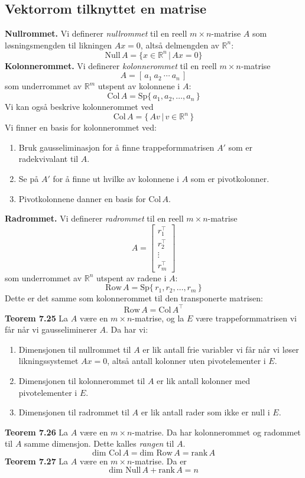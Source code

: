 \documentclass{article}
\begin{document}
\subsection{Vektorrom tilknyttet en matrise}
\textbf{Nullrommet.} Vi definerer \textit{nullrommet} til en reell $m \times n$-matrise $A$ som løsningsmengden til likningen $Ax = 0$, altså delmengden av $\mathbb{R}^n$:
\[ \text{Null}\,A = \{ x \in \mathbb{R}^n \,|\, Ax = 0 \} \]
\textbf{Kolonnerommet.} Vi definerer \textit{kolonnerommet} til en reell $m \times n$-matrise
\[ A = [\, a_1 \ a_2 \ \cdots \ a_n \,] \]
som underrommet av $\mathbb{R}^m$ utspent av kolonnene i $A$:
\[ \text{Col}\,A = \text{Sp} \{\, a_1, a_2, \dots, a_n \,\} \]
Vi kan også beskrive kolonnerommet ved
\[ \text{Col}\,A = \{\, Av \,|\, v \in \mathbb{R}^n \,\} \]
Vi finner en basis for kolonnerommet ved:
\begin{enumerate}
    \item Bruk gausseliminasjon for å finne trappeformmatrisen $A'$ som er radekvivalant til $A$.
    \item Se på $A'$ for å finne ut hvilke av kolonnene i $A$ som er pivotkolonner.
    \item Pivotkolonnene danner en basis for $\text{Col}\,A$.
\end{enumerate}
\textbf{Radrommet.} Vi definerer \textit{radrommet} til en reell $m \times n$-matrise
\[ A = \begin{bmatrix} r_1^\top \\ r_2^\top \\ \vdots \\ r_m^\top \end{bmatrix} \]
som underrommet av $\mathbb{R}^n$ utspent av radene i $A$:
\[ \text{Row}\,A = \text{Sp} \{\, r_1, r_2, \dots, r_m \,\} \]
Dette er det samme som kolonnerommet til den transponerte matrisen:
\[ \text{Row}\,A = \text{Col}\,A^\top \]
\textbf{Teorem 7.25} La $A$ være en $m \times n$-matrise, og la $E$ være trappeformmatrisen vi får når vi gausseliminerer $A$. Da har vi:
\begin{enumerate}
    \item Dimensjonen til nullrommet til $A$ er lik antall frie variabler vi får når vi løser likningssystemet $Ax = 0$, altså antall kolonner uten pivotelementer i $E$.
    \item Dimensjonen til kolonnerommet til $A$ er lik antall kolonner med pivotelementer i $E$.
    \item Dimensjonen til radrommet til $A$ er lik antall rader som ikke er null i $E$.
\end{enumerate}
\textbf{Teorem 7.26} La $A$ være en $m \times n$-matrise. Da har kolonnerommet og radommet til $A$ samme dimensjon. Dette kalles \textit{rangen} til $A$.
\[ \text{dim Col}\,A = \text{dim Row}\,A = \text{rank}\,A\]
\textbf{Teorem 7.27} La $A$ være en $m \times n$-matrise. Da er
\[ \text{dim Null}\,A + \text{rank}\,A = n \]
\end{document}

